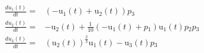 \begin{align}
\frac{du{_1}(t)}{dt} =& \left(  - \mathrm{u{_1}}\left( t \right) + \mathrm{u{_2}}\left( t \right) \right) p{_3} \\
\frac{du{_2}(t)}{dt} =&  - \mathrm{u{_2}}\left( t \right) + \frac{1}{10} \left(  - \mathrm{u{_1}}\left( t \right) + p{_1} \right) \mathrm{u{_1}}\left( t \right) p{_2} p{_3} \\
\frac{du{_3}(t)}{dt} =& \left( \mathrm{u{_2}}\left( t \right) \right)^{\frac{2}{3}} \mathrm{u{_1}}\left( t \right) - \mathrm{u{_3}}\left( t \right) p{_3}
\end{align}
